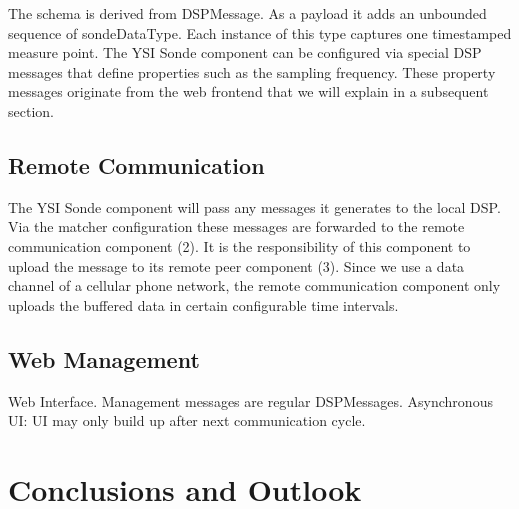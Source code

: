 \documentclass[conference]{IEEEtran}
\begin{document}
The schema is derived from DSPMessage. As a payload it adds an
unbounded sequence of sondeDataType. Each instance of this type
captures one timestamped measure point. The YSI Sonde component can be
configured via special DSP messages that define properties such as the
sampling frequency. These property messages originate from the web
frontend that we will explain in a subsequent section.

\subsection{Remote Communication}

The YSI Sonde component will pass any messages it generates to the
local DSP. Via the matcher configuration these messages are forwarded
to the remote communication component (2). It is the responsibility of
this component to upload the message to its remote peer component
(3). Since we use a data channel of a cellular phone network, the
remote communication component only uploads the buffered data in
certain configurable time intervals. 

\subsection{Web Management}

Web Interface. Management messages are regular
DSPMessages. Asynchronous UI: UI may only build up after next
communication cycle.

\section{Conclusions and Outlook}
\end{document}
